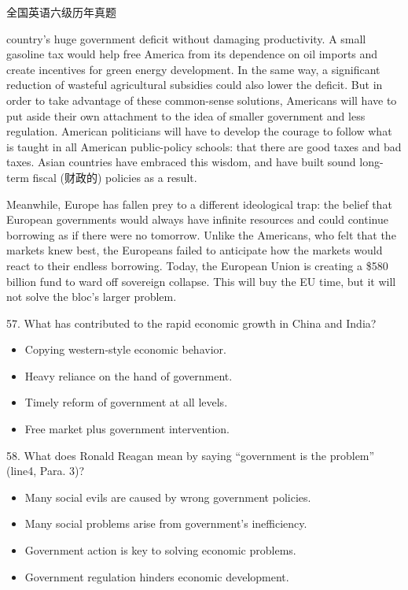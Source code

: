 \documentclass[UTF8,11pt]{ctexart}
\begin{document}
全国英语六级历年真题


country’s huge government deficit without damaging productivity. A small gasoline tax would help free America from its dependence on oil imports and create incentives for green energy development. In the same way, a significant reduction of wasteful agricultural subsidies could also lower the deficit. But in order to take advantage of these common-sense solutions, Americans will have to put aside their own attachment to the idea of smaller government and less regulation. American politicians will have to develop the courage to follow what is taught in all American public-policy schools: that there are good taxes and bad taxes. Asian countries have embraced this wisdom, and have built sound long-term fiscal (财政的) policies as a result.


Meanwhile, Europe has fallen prey to a different ideological trap: the belief that European governments would always have infinite resources and could continue borrowing as if there were no tomorrow. Unlike the Americans, who felt that the markets knew best, the Europeans failed to anticipate how the markets would react to their endless borrowing. Today, the European Union is creating a \$580 billion fund to ward off sovereign collapse. This will buy the EU time, but it will not solve the bloc’s larger problem.


57. What has contributed to the rapid economic growth in China and India?


\begin{itemize}[leftmargin=2em,itemsep=.2em,topsep=.4em]\item[A.] Copying western-style economic behavior.
\item[B.] Heavy reliance on the hand of government.
\item[C.] Timely reform of government at all levels.
\item[D.] Free market plus government intervention.
\end{itemize}

58. What does Ronald Reagan mean by saying “government is the problem” (line4, Para. 3)?


\begin{itemize}[leftmargin=2em,itemsep=.2em,topsep=.4em]\item[A.] Many social evils are caused by wrong government policies.
\item[B.] Many social problems arise from government’s inefficiency.
\item[C.] Government action is key to solving economic problems.
\item[D.] Government regulation hinders economic development.
\end{itemize}
\end{document}
